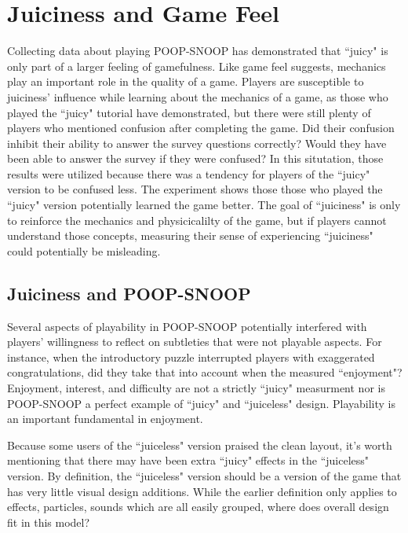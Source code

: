 \section{Juiciness and Game Feel}

Collecting data about playing POOP-SNOOP has demonstrated that ``juicy" is only part of a larger feeling of gamefulness. Like game feel suggests, mechanics play an important role in the quality of a game. Players are susceptible to juiciness' influence while learning about the mechanics of a game, as those who played the ``juicy" tutorial have demonstrated, but there were still plenty of players who mentioned confusion after completing the game. Did their confusion inhibit their ability to answer the survey questions correctly? Would they have been able to answer the survey if they were confused? In this situtation, those results were utilized because there was a tendency for players of the ``juicy" version to be confused less. The experiment shows those those who played the ``juicy" version potentially learned the game better. The goal of ``juiciness" is only to reinforce the mechanics and physicicalilty of the game, but if players cannot understand those concepts, measuring their sense of experiencing ``juiciness" could potentially be misleading.

\subsection{Juiciness and POOP-SNOOP}

Several aspects of playability in POOP-SNOOP potentially interfered with players' willingness to reflect on subtleties that were not playable aspects. For instance, when the introductory puzzle interrupted players with exaggerated congratulations, did they take that into account when the measured ``enjoyment"? Enjoyment, interest, and difficulty are not a strictly ``juicy" measurment nor is POOP-SNOOP a perfect example of ``juicy" and ``juiceless" design. Playability is an important fundamental in enjoyment.

Because some users of the ``juiceless" version praised the clean layout, it's worth mentioning that there may have been extra ``juicy" effects in the ``juiceless" version. By definition, the ``juiceless" version should be a version of the game that has very little visual design additions. While the earlier definition only applies to effects, particles, sounds which are all easily grouped, where does overall design fit in this model?

